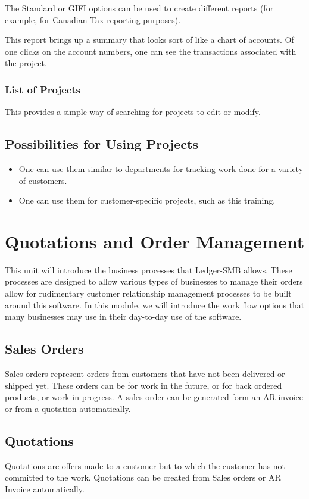 \documentclass{article}
\begin{document}
The Standard or GIFI options can be used to create different reports (for
example, for Canadian Tax reporting purposes). 

This report brings up a summary that looks sort of like a chart of accounts.  Of
one clicks on the account numbers, one can see the transactions associated with
the project.

\subsubsection{List of Projects}

This provides a simple way of searching for projects to edit or modify.

\subsection{Possibilities for Using Projects}
\begin{itemize}
\item One can use them similar to departments for tracking work done for a
variety of customers.
\item One can use them for customer-specific projects, such as this training.
\end{itemize}
\section{Quotations and Order Management}

This unit will introduce the business processes that Ledger-SMB allows.  These
processes are designed to allow various types of businesses to manage their
orders allow for rudimentary customer relationship management processes to be
built around this software.  In this module, we will introduce the work flow
options that many businesses may use in their day-to-day use of the software.

\subsection{Sales Orders}
Sales orders represent orders from customers that have not been delivered or
shipped yet.  These orders can be for work in the future, or for back ordered
products, or work in progress.  A sales order can be generated form an AR 
invoice or from a quotation automatically.

\subsection{Quotations}
Quotations are offers made to a customer but to which the customer has not
committed to the work.  Quotations can be created from Sales orders or AR
Invoice automatically.
\end{document}
